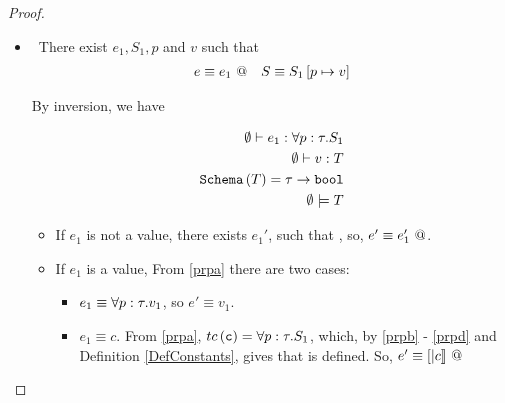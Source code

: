 \begin{proof}
\begin{itemize}
\item \tpinst\ There exist $e_1, S_1, p$ and $v$ such that
\begin{align*}
e \equiv {e_1} \ @ && S \equiv S_1\left[ p \mapsto v \right]
\end{align*}

By inversion, we have

\begin{align}
{\emptyset}\vdash {e_1}:{\forall p : \tau . S_1} \label{prpa}\\
{\emptyset}\vdash {v}:{T} \label{prpb}\\
\texttt{Schema}\left(T\right) = \tau \rightarrow \texttt{bool} \label{prpc}\\
{\emptyset}\models {T} \label{prpd}
\end{align} 

	\begin{itemize}
	\item If $e_1$ is not a value, 
	there exists $e_1'$, such that , 
	so, $e' \equiv {e_1'} \ @$.

	\item If $e_1$ is a value,
	 From \ref{prpa} there are two cases:

		\begin{itemize}
		\item $e_1 \equiv \forall p : \tau . v_{1}$, so $e' \equiv v_1$.
		\item $e_1 \equiv c$.
		From \ref{prpa}, $tc\left(\texttt{c}\right) = \forall p : \tau . S_1$, 
		which, by \ref{prpb} - \ref{prpd} and Definition \ref{DefConstants},
		gives that \epapp{[|c|]} is defined.
		So, $e' \equiv {[|c|]} \ @$
		\end{itemize}
	\end{itemize}
\end{itemize}
\end{proof}

